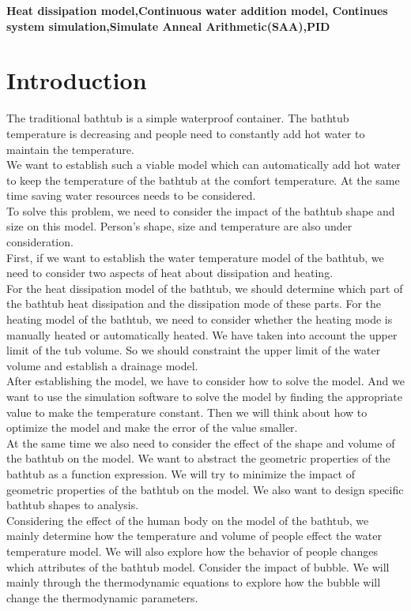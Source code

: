 \documentclass{mcmthesis}
\begin{document}
\begin{keywords}
	\textbf{Heat dissipation model,\indent Continuous water addition model, \indent Continues system simulation,\indent Simulate Anneal Arithmetic(SAA),\indent PID}
\end{keywords}
\maketitle
\tableofcontents\thispagestyle{empty}
\newpage

\setcounter{page}{1}
\section{Introduction}
\indent The traditional bathtub is a simple waterproof container.
The bathtub temperature is decreasing and people need to constantly add hot water to maintain the temperature.\\
\indent We want to establish such a viable model which can automatically add hot water to keep the temperature of the bathtub at the comfort temperature. At the same time saving water resources needs to be considered.\\
\indent To solve this problem, we need to consider the impact of the bathtub shape and size on this model. Person's shape, size and temperature are also under consideration.\\
\indent First, if we want to establish the water temperature model of the bathtub, we need to consider two aspects of heat about dissipation and heating.\\
\indent For the heat dissipation model of the bathtub, we should determine which part of the bathtub heat dissipation and the dissipation mode of these parts. For the heating model of the bathtub, we need to consider whether the heating mode is manually heated or automatically heated. We have taken into account the upper limit of the tub volume. So we should constraint the upper limit of the water volume and establish a drainage model.\\
\indent After establishing the model, we have to consider how to solve the model. And we want to use the simulation software to solve the model by finding the appropriate value to make the temperature constant. Then we will think about how to optimize the model and make the error of the value smaller. \\
\indent At the same time we also need to consider the effect of the shape and volume of the bathtub on the model. We want to abstract the geometric properties of the bathtub as a function expression. We will try to minimize the impact of geometric properties of the bathtub on the model. We also want to design specific bathtub shapes to analysis.\\
\indent Considering the effect of the human body on the model of the bathtub, we mainly determine how the temperature and volume of people effect the water temperature model. We will also explore how the behavior of people changes which attributes of the bathtub model.
Consider the impact of bubble. We will mainly through the thermodynamic equations to explore how the bubble will change the thermodynamic parameters.
\end{document}
